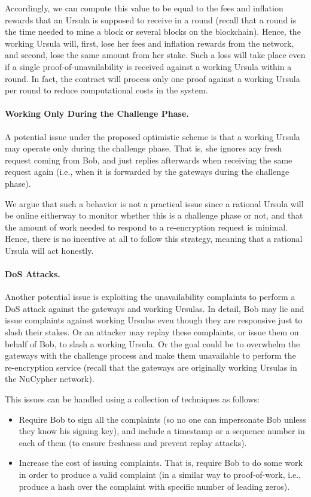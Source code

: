 Accordingly, we can compute this value to be equal to the fees and inflation rewards that an Ursula is supposed to receive in a round (recall that a round is the time needed to mine a block or several blocks on the blockchain). Hence, the working Ursula will, first, lose her fees and inflation rewards from the network, and second, lose the same amount from her stake. Such a loss will take place even if a single proof-of-unavailability is received against a working Ursula within a round. In fact, the \stakeescrow contract will process only one proof against a working Ursula per round to reduce computational costs in the system. 


\paragraph{\bf Working Only During the Challenge Phase.}
A potential issue under the proposed optimistic scheme is that a working Ursula may operate only during the challenge phase. That is, she ignores any fresh request coming from Bob, and just replies afterwards when receiving the same request again (i.e., when it is forwarded by the gateways during the challenge phase). 


We argue that such a behavior is not a practical issue since a rational Ursula will be online eitherway to monitor whether this is a challenge phase or not, and that the amount of work needed to respond to a re-encryption request is minimal. Hence, there is no incentive at all to follow this strategy, meaning that a rational Ursula will act honestly.


\paragraph{\bf DoS Attacks.} 
Another potential issue is exploiting the unavailability complaints to perform a DoS attack against the gateways and working Ursulas. In detail, Bob may lie and issue complaints against working Ursulas even though they are responsive just to slash their stakes. Or an attacker may replay these complaints, or issue them on behalf of Bob, to slash a working Ursula. Or the goal could be to overwhelm the gateways with the challenge process and make them unavailable to perform the re-encryption service (recall that the gateways are originally working Ursulas in the NuCypher network).


This issues can be handled using a collection of techniques as follows:
\begin{itemize}
\item Require Bob to sign all the complaints (so no one can impersonate Bob unless they know his signing key), and include a timestamp or a sequence number in each of them (to ensure freshness and prevent replay attacks).

\item Increase the cost of issuing complaints. That is, require Bob to do some work in order to produce a valid complaint (in a similar way to proof-of-work, i.e., produce a hash over the complaint with specific number of leading zeros).
\end{itemize}


